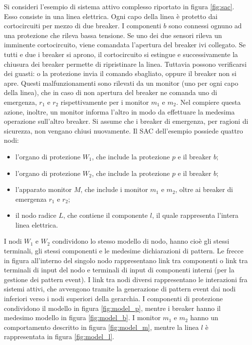\begin{ex} \label{ex:ref}
Si consideri l'esempio di sistema attivo complesso riportato in figura \ref{fig:sac}. Esso consiste in una linea elettrica. Ogni capo della linea è protetto dai cortocircuiti per mezzo di due breaker. I componenti $b$ sono connessi ognuno ad una protezione che rileva bassa tensione. Se uno dei due sensori rileva un imminente cortocircuito, viene comandata l'apertura del breaker ivi collegato. Se tutti e due i breaker si aprono, il cortocircuito si estingue e successivamente la chiusura dei breaker permette di ripristinare la linea. Tuttavia possono verificarsi dei guasti: o la protezione invia il comando sbagliato, oppure il breaker non si apre. Questi malfunzionamenti sono rilevati da un monitor (uno per ogni capo della linea), che in caso di non apertura del breaker ne comanda uno di emergenza, $r_1$ e $r_2$ rispettivamente per i monitor $m_1$ e $m_2$. Nel compiere questa azione, inoltre, un monitor informa l'altro in modo da effettuare la medesima operazione sull'altro breaker. Si assume che i breaker di emergenza, per ragioni di sicurezza, non vengano chiusi nuovamente. Il SAC dell'esempio possiede quattro nodi:
\begin{itemize}
\item l'organo di protezione $W_1$, che include la protezione $p$ e il breaker $b$;
\item l'organo di protezione $W_2$, che include la protezione $p$ e il breaker $b$;
\item l'apparato monitor $M$, che include i monitor $m_1$ e $m_2$, oltre ai breaker di emergenza $r_1$ e $r_2$;
\item il nodo radice $L$, che contiene il componente $l$, il quale rappresenta l'intera linea elettrica.
\end{itemize}
I nodi $W_1$ e $W_2$ condividono lo stesso modello di nodo, hanno cioè gli stessi terminali, gli stessi componenti e le medesime dichiarazioni di pattern.
Le frecce in figura all'interno del singolo nodo rappresentano link tra componenti o link tra terminali di input del nodo e terminali di input di componenti interni (per la gestione dei pattern event). I link tra nodi diversi rappresentano le interazioni fra sistemi attivi, che avvengono tramite la generazione di pattern event dai nodi inferiori verso i nodi superiori della gerarchia.
I componenti di protezione condividono il modello in figura \ref{fig:model_p}, mentre i breaker hanno il medesimo modello in figura \ref{fig:model_b}. I monitor $m_1$ e $m_2$ hanno un comportamento descritto in figura \ref{fig:model_m}, mentre la linea $l$ è rappresentata in figura \ref{fig:model_l}.

\end{ex}
